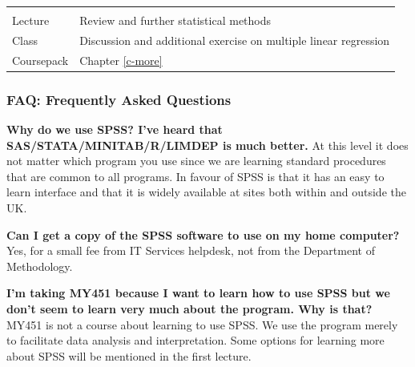 \documentclass[11pt,a4paper,openany]{book}
\begin{document}
\begin{longtable}[]{@{}ll@{}}
\begin{minipage}[t]{0.76\columnwidth}
\strut
\end{minipage}\tabularnewline
\begin{minipage}[t]{0.19\columnwidth}\raggedright\strut
Lecture\strut
\end{minipage} & \begin{minipage}[t]{0.76\columnwidth}\raggedright\strut
Review and further statistical methods\strut
\end{minipage}\tabularnewline
\begin{minipage}[t]{0.19\columnwidth}\raggedright\strut
Class\strut
\end{minipage} & \begin{minipage}[t]{0.76\columnwidth}\raggedright\strut
Discussion and additional exercise on multiple linear regression\strut
\end{minipage}\tabularnewline
\begin{minipage}[t]{0.19\columnwidth}\raggedright\strut
Coursepack\strut
\end{minipage} & \begin{minipage}[t]{0.76\columnwidth}\raggedright\strut
Chapter \ref{c-more}\strut
\end{minipage}\tabularnewline
\bottomrule
\end{longtable}

\newpage

\subsubsection*{FAQ: Frequently Asked
Questions}\label{faq-frequently-asked-questions}

\textbf{Why do we use SPSS? I've heard that SAS/STATA/MINITAB/R/LIMDEP
is much better.} At this level it does not matter which program you use
since we are learning standard procedures that are common to all
programs. In favour of SPSS is that it has an easy to learn interface
and that it is widely available at sites both within and outside the UK.

\textbf{Can I get a copy of the SPSS software to use on my home
computer?} Yes, for a small fee from IT Services helpdesk, not from the
Department of Methodology.

\textbf{I'm taking MY451 because I want to learn how to use SPSS but we
don't seem to learn very much about the program. Why is that?} MY451 is
not a course about learning to use SPSS. We use the program merely to
facilitate data analysis and interpretation. Some options for learning
more about SPSS will be mentioned in the first lecture.
\end{document}
